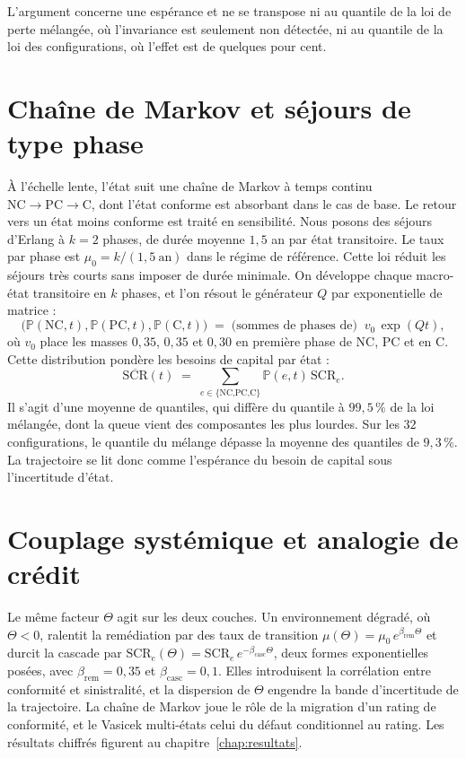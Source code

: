 L'argument concerne une
espérance et ne se transpose ni au quantile de la loi de perte mélangée, où l'invariance est
seulement non détectée, ni au quantile de la loi des configurations, où l'effet est de quelques pour
cent.

\section{Chaîne de Markov et séjours de type phase}


À l'échelle lente, l'état suit une chaîne de Markov à temps continu
$\text{NC}\to\text{PC}\to\text{C}$, dont l'état conforme est absorbant dans le cas de base. Le
retour vers un état moins conforme est traité en sensibilité. Nous posons des séjours d'Erlang à $k=2$ phases,
de durée moyenne $1{,}5$ an par état transitoire. Le taux par phase est $\mu_0=k/(1{,}5\ \text{an})$ dans le régime de référence.
Cette loi réduit les séjours très courts sans imposer de durée minimale. On développe chaque
macro-état transitoire en $k$ phases, et l'on résout le générateur $Q$ par exponentielle de matrice :
\begin{equation}
\big(\mathbb P(\text{NC},t),\mathbb P(\text{PC},t),\mathbb P(\text{C},t)\big)
\;=\; \text{(sommes de phases de)}\;\; v_0\,\exp(Qt),
\end{equation}
où $v_0$ place les masses $0{,}35$, $0{,}35$ et $0{,}30$ en première phase de NC, PC et en C. Cette distribution pondère les besoins de capital par état :
\begin{equation}
\overline{\mathrm{SCR}}(t)\;=\;\sum_{e\in\{\text{NC,PC,C}\}}\mathbb P(e,t)\,\mathrm{SCR}_e .
\end{equation}
Il s'agit d'une moyenne de quantiles, qui diffère du quantile à $99{,}5\,\%$ de la loi mélangée,
dont la queue vient des composantes les plus lourdes. Sur les $32$ configurations, le quantile du mélange dépasse la moyenne des quantiles de $9{,}3\,\%$. La trajectoire se lit donc comme l'espérance du
besoin de capital sous l'incertitude d'état.


\section{Couplage systémique et analogie de crédit}
\label{sec:couplage}

Le même facteur $\Theta$ agit sur les deux couches. Un environnement dégradé, où $\Theta<0$,
ralentit la remédiation par des taux de transition $\mu(\Theta)=\mu_0\,e^{\beta_{\text{rem}}\Theta}$
et durcit la cascade par $\mathrm{SCR}_e(\Theta)=\mathrm{SCR}_e\,e^{-\beta_{\text{casc}}\Theta}$,
deux formes exponentielles posées, avec $\beta_{\text{rem}}=0{,}35$ et $\beta_{\text{casc}}=0{,}1$. Elles introduisent la corrélation entre conformité et
sinistralité, et la dispersion de $\Theta$
engendre la bande d'incertitude de la trajectoire. La chaîne de Markov joue le rôle de la migration
d'un rating de conformité, et le Vasicek multi-états celui du défaut conditionnel au rating. Les
résultats chiffrés figurent au chapitre~\ref{chap:resultats}.

